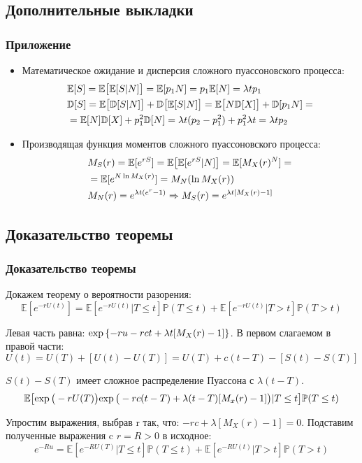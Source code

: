 \documentclass[10pt]{beamer}
\newcommand\Exp{{\rm exp \,}}
\newcommand\E{\mathbb{E}}
\newcommand\D{\mathbb{D}}
\newcommand\Pro{\mathbb{P}}
\numberwithin{equation}{section}
\begin{document}
\subsection{Дополнительные выкладки}
\begin{frame}
\frametitle{Приложение}
\begin{itemize}
    \item Математическое ожидание и дисперсия сложного пуассоновского процесса:
    \begin{align}
    \label{eq:PoisExp}
    & \E[S] = \E\big[\E[S|N]\big]=\E[p_1 N] = p_1\E[N] = \lambda t p_1 \\
    \label{eq:PoisVar}
    & \D[S] = \E\big[\D[S|N]\big] + \D\big[\E[S|N]\big] = \E\big[N\D[X]\big] + \D[p_1N] =\notag \\
    & = \E[N]\D[X] + p_1 ^2 \D[N] = \lambda t (p_2 - p_1^2) + p_1^2 \lambda t = \lambda t p_2
    \end{align}
    \item Производящая функция моментов сложного пуассоновского процесса:
    \begin{align}
    & M_S (r) = \mathbb{E}[e^{rS}]=\mathbb{E}\big[\mathbb{E}[e^{rS}|N]\big]=\mathbb{E}[M_X (r)^N]=
    \notag \\
    & = \mathbb{E}[e^{N \ln{M_X (r)}}]= M_N (\ln{M_X (r)}) \\
    & M_N (r) = e^{\lambda t(e^r - 1)} \Rightarrow M_S (r) = e^{\lambda t[M_X (r) - 1]}
    \end{align}
\end{itemize}
\end{frame}


\subsection{Доказательство теоремы}
\begin{frame}
\frametitle{Доказательство теоремы}
\noindent
Докажем теорему о вероятности разорения:
\begin{equation}
\E[e^{-rU(t)}] = \E[e^{-rU(t)}|T \leq t]\Pro(T \leq t) + \E[e^{-rU(t)}|T > t]\Pro(T > t)
\end{equation}

\noindent
Левая часть равна: $\Exp\{-ru - rct + \lambda t [M_X(r) - 1]\}$.
В первом слагаемом в правой части:
\begin{equation}
U(t) = U(T) + [U(t) - U(T)] =  U(T) + c(t - T) - [S(t) - S(T)]
\end{equation}

\noindent
$S(t) - S(T)$ имеет сложное распределение Пуассона с $\lambda (t -T)$.
\begin{equation}
\E\big[\Exp\big(-rU(T)\big)\Exp\big(-rc(t-T) + \lambda (t - T)[M_x(r) - 1]\big)|T \leq t\big] 
\Pro (T \leq t)
\end{equation}

\noindent
Упростим выражения, выбрав r так, что: $-rc + \lambda [M_X(r) - 1] = 0$.
Подставим полученные выражения c $r = R > 0$ в исходное:
\begin{equation}
e^{-Ru} = \E[e^{-RU(T)}|T \leq t]\Pro(T \leq t) + \E[e^{-RU(t)}|T > t]\Pro(T > t)
\end{equation}
\end{frame}
\end{document}
